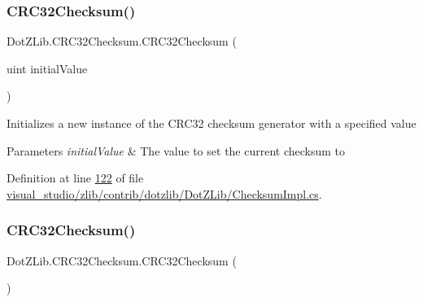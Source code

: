 \mbox{\label{class_dot_z_lib_1_1_c_r_c32_checksum_a7032fdb98254bd918ff19b5251c29634}} 
\subsubsection{\texorpdfstring{C\+R\+C32\+Checksum()}{CRC32Checksum()}\hspace{0.1cm}{\footnotesize\ttfamily [2/4]}}
{\footnotesize\ttfamily Dot\+Z\+Lib.\+C\+R\+C32\+Checksum.\+C\+R\+C32\+Checksum (\begin{DoxyParamCaption}\item[{uint}]{initial\+Value }\end{DoxyParamCaption})\hspace{0.3cm}{\ttfamily [inline]}}



Initializes a new instance of the C\+R\+C32 checksum generator with a specified value 


\begin{DoxyParams}{Parameters}
{\em initial\+Value} & The value to set the current checksum to\\
\hline
\end{DoxyParams}


Definition at line \hyperlink{visual__studio_2zlib_2contrib_2dotzlib_2_dot_z_lib_2_checksum_impl_8cs_source_l00122}{122} of file \hyperlink{visual__studio_2zlib_2contrib_2dotzlib_2_dot_z_lib_2_checksum_impl_8cs_source}{visual\+\_\+studio/zlib/contrib/dotzlib/\+Dot\+Z\+Lib/\+Checksum\+Impl.\+cs}.

\mbox{\label{class_dot_z_lib_1_1_c_r_c32_checksum_aae1fb7dbf6c57d17c321d0065cd608ca}} 
\subsubsection{\texorpdfstring{C\+R\+C32\+Checksum()}{CRC32Checksum()}\hspace{0.1cm}{\footnotesize\ttfamily [3/4]}}
{\footnotesize\ttfamily Dot\+Z\+Lib.\+C\+R\+C32\+Checksum.\+C\+R\+C32\+Checksum (\begin{DoxyParamCaption}{ }\end{DoxyParamCaption})\hspace{0.3cm}{\ttfamily [inline]}}



